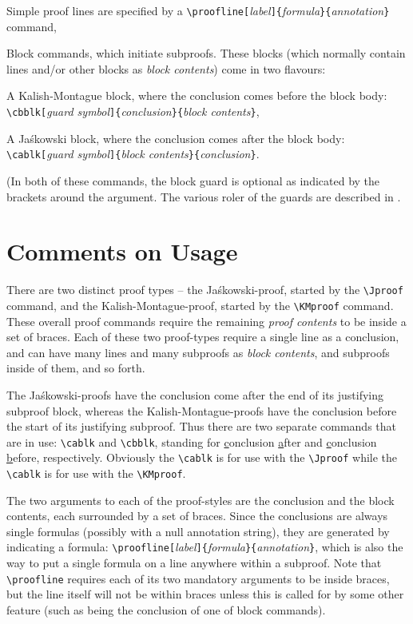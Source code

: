 \documentclass{article}
\newcommand{\Jas}{Ja\'skowski }
\newcommand{\JasA}{Ja\'skowski}
\newcommand{\KMa}{Kalish-Montague}
\begin{document}
\begin{compactenum}
\item Simple proof lines are specified by a \verb+\proofline[+\emph{label}\verb+]{+\emph{formula}\verb+}{+\emph{annotation}\verb+}+ command,
\item Block commands, which initiate subproofs.  These blocks (which normally contain lines and/or other blocks as \emph{block contents}) come in two flavours: 
\begin{compactenum}[(i)]
\item A Kalish-Montague block, where  the conclusion comes before the block body: \\ \verb+\cbblk[+\emph{guard symbol}\verb+]{+\emph{conclusion}\verb+}{+\emph{block contents}\verb+}+, 
\item A \Jas block, where the conclusion comes after the block body: \\ \verb+\cablk[+\emph{guard symbol}\verb+]{+\emph{block contents}\verb+}{+\emph{conclusion}\verb+}+. 
\item (In both of these commands, the block guard is optional as indicated by the brackets around the argument.  The various roler of the guards are described in \cite{ext14}.
\end{compactenum}
\end{compactenum}

\section{Comments on Usage}
There are two distinct proof types -- the \JasA-proof, started by the \verb+\Jproof+ command, and the \KMa-proof, started by the \verb+\KMproof+ command.  These overall proof commands require the remaining \emph{proof contents} to be inside a set of braces.  Each of these two proof-types require a single line as a conclusion, and can have many lines and many subproofs as \emph{block contents}, and subproofs inside of them, and so forth.

The \JasA-proofs have the conclusion come after the end of its justifying subproof block, whereas the \KMa-proofs have the conclusion before the start of its justifying subproof.  Thus there are two separate commands that are in use: \verb+\cablk+ and \verb+\cbblk+, standing for \uline{c}onclusion \uline{a}fter and \uline{c}onclusion \uline{b}efore, respectively.  Obviously the \verb+\cablk+ is for use with the \verb+\Jproof+ while the \verb+\cablk+ is for use with the \verb+\KMproof+.

The two arguments to each of the proof-styles are the conclusion and the block contents, each surrounded by a set of braces.  Since the conclusions are always single formulas (possibly with a null annotation string), they are generated by indicating a formula: \verb+\proofline[+\emph{label}\verb+]{+\emph{formula}\verb+}{+\emph{annotation}\verb+}+, which is also the way to put a single formula on a line anywhere within a subproof.  Note that \verb+\proofline+ requires each of its two mandatory arguments to be inside braces, but the line itself will not be within braces unless this is called for by some other feature (such as being the conclusion of one of block commands).
\end{document}
